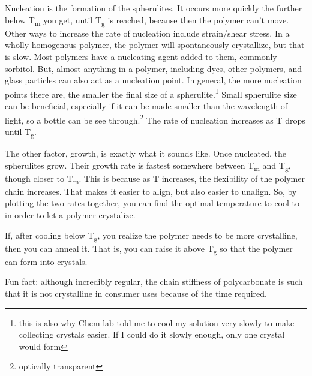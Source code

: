 \documentclass[12pt]{article}[titlepage]
\newcommand{\1}{\={a}}
\newcommand{\2}{\={e}}
\newcommand{\3}{\={\i}}
\newcommand{\4}{\=o}
\newcommand{\5}{\=u}
\newcommand{\6}{\={A}}
\newcommand{\sub}[1]{\textsubscript{#1}}
\renewcommand{\,}{\textsuperscript{,}}
\begin{document}
Nucleation is the formation of the spherulites.
It occurs more quickly the further below T\sub{m} you get, until T\sub{g} is reached, because then the polymer can't move.
Other ways to increase the rate of nucleation include strain/shear stress.
In a wholly homogenous polymer, the polymer will spontaneously crystallize, but that is slow.
Most polymers have a nucleating agent added to them, commonly sorbitol.
But, almost anything in a polymer, including dyes, other polymers, and glass particles can also act as a nucleation point.
In general, the more nucleation points there are, the smaller the final size of a spherulite.\footnote{this is also why Chem lab told me to cool my solution very slowly to make collecting crystals easier. If I could do it slowly enough, only one crystal would form}
Small spherulite size can be beneficial, especially if it can be made smaller than the wavelength of light, so a bottle can be see through.\footnote{optically transparent}
The rate of nucleation increases as T drops until T\sub{g}.

The other factor, growth, is exactly what it sounds like.
Once nucleated, the spherulites grow.
Their growth rate is fastest somewhere between T\sub{m} and T\sub{g}, though closer to T\sub{m}.
This is because as T increases, the flexibility of the polymer chain increases.
That makes it easier to align, but also easier to unalign.
So, by plotting the two rates together, you can find the optimal temperature to cool to in order to let a polymer crystalize.

If, after cooling below T\sub{g}, you realize the polymer needs to be more crystalline, then you can anneal it.
That is, you can raise it above T\sub{g} so that the polymer can form into crystals.

Fun fact: although incredibly regular, the chain stiffness of polycarbonate is such that it is not crystalline in consumer uses because of the time required.
\end{document}
